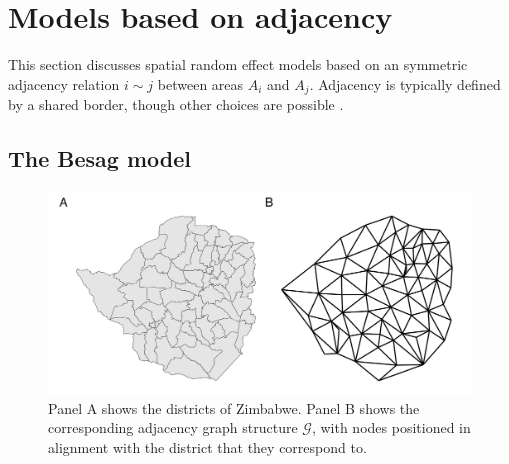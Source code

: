 \documentclass[a4paper, nobind]{templates/ociamthesis}
\begin{document}
\hypertarget{adjacency}{%
\section{Models based on adjacency}\label{adjacency}}

This section discusses spatial random effect models based on an symmetric adjacency relation \(i \sim j\) between areas \(A_i\) and \(A_j\).
Adjacency is typically defined by a shared border, though other choices are possible \autocite{paciorek2013spatial}.

\hypertarget{besag}{%
\subsection{The Besag model}\label{besag}}



\begin{figure}
\includegraphics[width=0.95\linewidth]{figures/beyond-borders/geometry-graph} \caption{Panel A shows the districts of Zimbabwe. Panel B shows the corresponding adjacency graph structure \(\mathcal{G}\), with nodes positioned in alignment with the district that they correspond to.}\label{fig:geometry-graph}
\end{figure}
\end{document}

